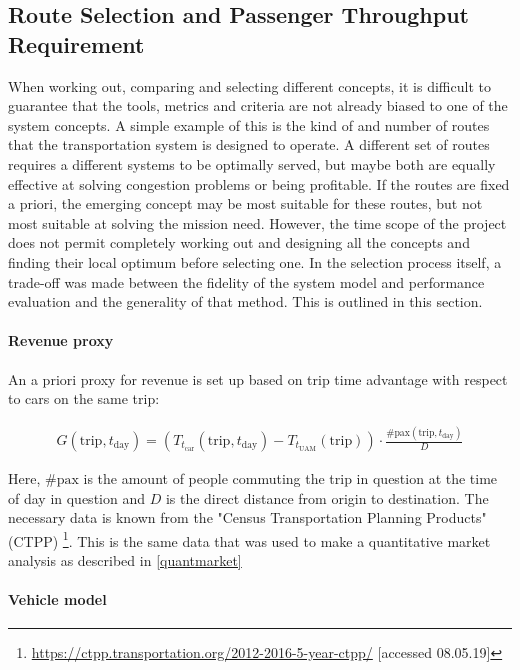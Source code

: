\subsection{Route Selection and Passenger Throughput Requirement} \label{subsec:routeselection}

When working out, comparing and selecting different concepts, it is difficult to guarantee that the tools, metrics and criteria are not already biased to one of the system concepts. A simple example of this is the kind of and number of routes that the transportation system is designed to operate. A different set of routes requires a different systems to be optimally served, but maybe both are equally effective at solving congestion problems or being profitable. If the routes are fixed a priori, the emerging concept may be most suitable for these routes, but not most suitable at solving the mission need. However, the time scope of the project does not permit completely working out and designing all the concepts and finding their local optimum before selecting one. In the selection process itself, a trade-off was made between the fidelity of the system model and performance evaluation and the generality of that method. This is outlined in this section.


\paragraph{Revenue proxy}

An a priori proxy for revenue is set up based on trip time advantage with respect to cars on the same trip:

\begin{align} \label{eq:gainmetric}
    G(\text{trip}, t_\text{day}) = \left( T_{t_\text{car}}(\text{trip}, t_\text{day}) - T_{{t}_\text{UAM}}(\text{trip}) \right) \cdot \frac{\#\text{pax}(\text{trip},t_\text{day})}{D}
\end{align}

Here, $\#\text{pax}$ is the amount of people commuting the trip in question at the time of day in question and $D$ is the direct distance from origin to destination. The necessary data is known from the "Census Transportation Planning Products" (CTPP) \footnote{\url{https://ctpp.transportation.org/2012-2016-5-year-ctpp/} [accessed 08.05.19]}. This is the same data that was used to make a quantitative market analysis as described in \autoref{quantmarket}

\paragraph{Vehicle model}

